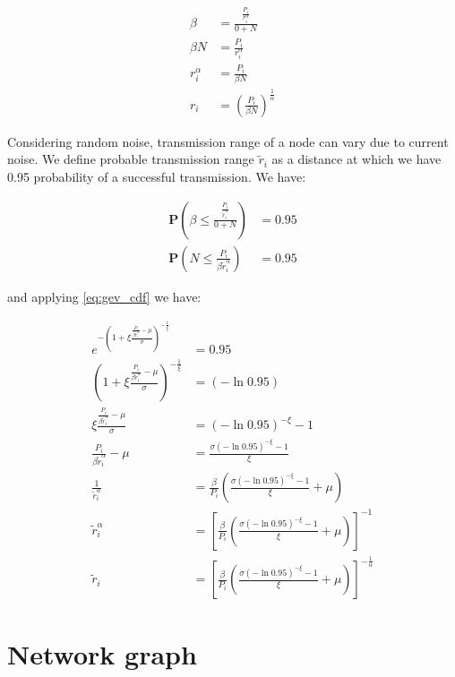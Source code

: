 \documentclass[a4paper,draft,12pt]{report}
\begin{document}
\begin{align*}
\beta &= \frac{\frac{P_i}{r_i^\alpha}}{0 + N} \\
\beta N &= \frac{P_i}{r_i^\alpha} \\
r_i^\alpha &= \frac{P_i}{\beta N} \\
r_i &= \left( \frac{P_i}{\beta N} \right)^{\frac{1}{\alpha}}
\end{align*}

Considering random noise, transmission range of a node can vary due to current noise. We define probable transmission range $\tilde{r}_i$ as a distance at which we have 0.95 probability of a successful transmission.  We have:

\begin{align*}
\textbf{P}  \left( \beta \leq \frac{\frac{P_i}{\tilde{r}_i^\alpha}}{0 + N} \right) &= 0.95 \\
\textbf{P}  \left( N \leq \frac{P_i}{\beta \tilde{r}_i^\alpha} \right) &=  0.95
\end{align*}

and applying \eqref{eq:gev_cdf} we have:

\begin{align}
e^{-\left(1 + \xi \frac{\frac{P_i}{\beta \tilde{r}_i^\alpha}  - \mu}{\sigma}\right) ^ {-\frac{1}{\xi}}}& = 0.95 \nonumber \\
\left(1 + \xi \frac{\frac{P_i}{\beta \tilde{r}_i^\alpha}  - \mu}{\sigma}\right) ^ {-\frac{1}{\xi}} &= (- \ln 0.95) \nonumber \\
\xi \frac{\frac{P_i}{\beta \tilde{r}_i^\alpha}  - \mu}{\sigma} &= (- \ln 0.95)^{-\xi} - 1\nonumber \\
\frac{P_i}{\beta \tilde{r}_i^\alpha}  - \mu &= \frac{\sigma (- \ln 0.95)^{-\xi} - 1}{\xi} \nonumber\\
\frac{1}{\tilde{r}_i^\alpha} &= \frac{\beta}{P_i} \left( \frac{\sigma (- \ln 0.95)^{-\xi} - 1}{\xi} + \mu \right)\nonumber \\
\tilde{r}_i^\alpha  &= \left[ \frac{\beta}{P_i} \left( \frac{\sigma (- \ln 0.95)^{-\xi} - 1}{\xi} + \mu \right) \right]^{-1}\nonumber \\
\tilde{r}_i  &= \left[ \frac{\beta}{P_i} \left( \frac{\sigma (- \ln 0.95)^{-\xi} - 1}{\xi} + \mu \right) \right]^{-\frac{1}{\alpha}}
\end{align}

\chapter{Network graph}
\end{document}
